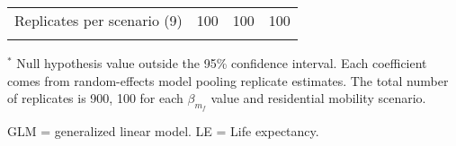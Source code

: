 \begin{table}[htp]
\begin{threeparttable}
\begin{tabular}{l D{.}{.}{3.9} D{.}{.}{3.9} D{.}{.}{3.8}}

\addlinespace[10pt]
\addlinespace
\hline
\addlinespace
Replicates per scenario (9)                     & 100            & 100            & 100            \\
\addlinespace
\hline
\addlinespace
\end{tabular}
    \begin{tablenotes}
      \scriptsize
      \item $^*$ Null hypothesis value outside the 95\% confidence interval. Each coefficient comes from random-effects model pooling replicate estimates. The total number of replicates is 900, 100 for each $\beta_{m_{f}}$ value and residential mobility scenario.
      \item GLM = generalized linear model. LE = Life expectancy.
    \end{tablenotes}
\end{threeparttable}
\end{table}
